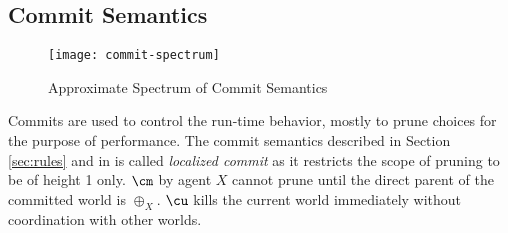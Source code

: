 \subsection{Commit Semantics}\label{sec:commit2}

\begin{figure}
  \centering
  \texttt{[image: commit-spectrum]}
  \caption{Approximate Spectrum of Commit Semantics}
  \label{fig:commit-spectrum}
\end{figure}

Commits are used to control the run-time behavior,
mostly to prune choices for the purpose of performance.
The commit semantics described in Section \ref{sec:rules} and
in  is called {\em localized commit} as it restricts
the scope of pruning to be of height 1 only.  $\cm$ by agent $X$ cannot
prune until the direct parent of the committed world is $\oplus_X$.
$\cu$ kills the current world immediately without coordination with other worlds.

